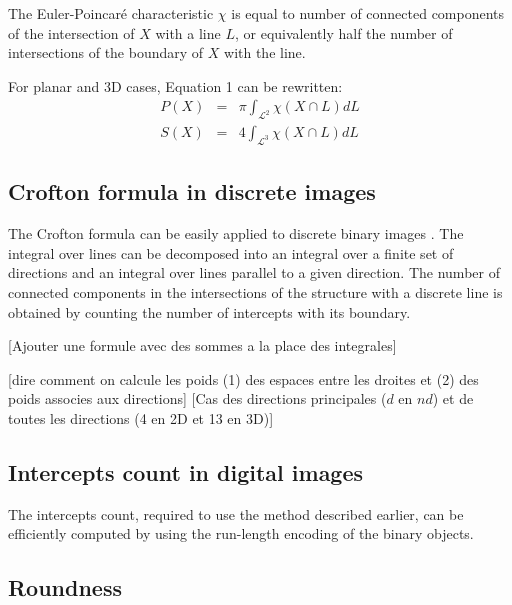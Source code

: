 \documentclass{InsightArticle}
\begin{document}
The Euler-Poincar\'e characteristic $\chi$ is equal to number of connected components
of the intersection of $X$ with a line $L$, or equivalently half the number of intersections
of the boundary of $X$ with the line.

For planar and 3D cases, Equation 1 can be rewritten:
\begin{eqnarray}
P(X) & = & \pi \int_{\mathcal{L}^2} \chi \left( X \cap L \right) dL \\
S(X) & = &  4  \int_{\mathcal{L}^3} \chi \left( X \cap L \right) dL
\end{eqnarray}

\subsection{Crofton formula in discrete images}

The Crofton formula can be easily applied to discrete binary images \cite{Lang2001, Legland2007}. 
The integral over lines can be decomposed into an integral over a finite set of directions
and an integral over lines parallel to a given direction.
The number of connected components in the intersections of the structure with a discrete line
is obtained by counting the number of intercepts with its boundary.

[Ajouter une formule avec des sommes a la place des integrales]

[dire comment on calcule les poids (1) des espaces entre les droites et (2) des poids associes aux directions]
[Cas des directions principales ($d$ en $nd$) et de toutes les directions (4 en 2D et 13 en 3D)]

\subsection{Intercepts count in digital images}

The intercepts count, required to use the method described earlier, can be efficiently computed by using the run-length
encoding of the binary objects.

\subsection{Roundness}
\end{document}
